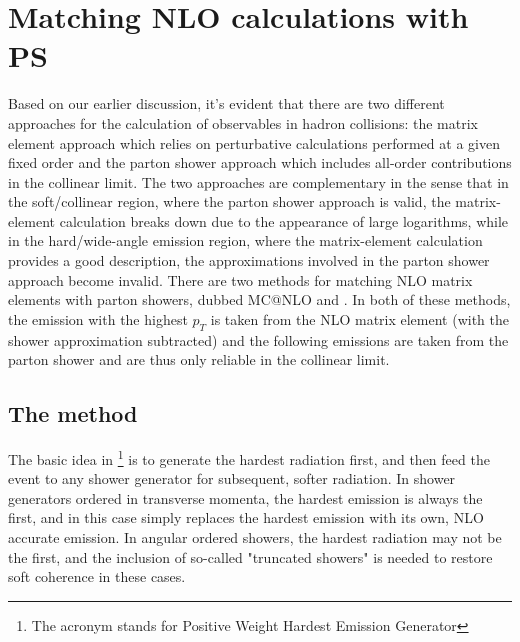 \section{Matching NLO calculations with PS}\label{sec:NLO+PS}
\noindent Based on our earlier discussion, it's evident that there are two different approaches for the calculation of observables in hadron collisions: the matrix element approach which relies on perturbative calculations performed at a given fixed order and the parton shower approach which includes all-order contributions in the collinear limit. The two approaches are complementary in the sense that in the soft/collinear region, where the parton shower approach is valid, the matrix-element calculation breaks down due to the appearance of large logarithms, while in the hard/wide-angle emission region, where the matrix-element calculation provides a good description, the approximations involved in the parton shower approach become invalid.
\indent There are two methods for matching NLO matrix elements with parton showers, dubbed MC@NLO \cite{Frixione_2002} and {\selectfont{Powheg}} \cite{67,68}. In both of these methods, the emission with the highest $p_T$ is taken from the NLO matrix element (with the shower approximation subtracted) and the following emissions are taken from the parton shower and are thus only reliable in the collinear limit.
\subsection{\label{subsec:POWHEG}The {\selectfont{Powheg}} method}
\noindent The basic idea in {\selectfont{Powheg}}\footnote{The acronym stands for Positive Weight Hardest Emission Generator} is to generate the hardest radiation first, and then feed the event to any shower generator for subsequent, softer radiation. In shower generators ordered in transverse momenta, the hardest emission is always the first, and in this case {\selectfont{Powheg}} simply replaces the hardest emission with its own, NLO accurate emission. In angular ordered showers, the hardest radiation may not be the first, and the inclusion of so-called "truncated showers" is needed to restore soft coherence in these cases.\\

